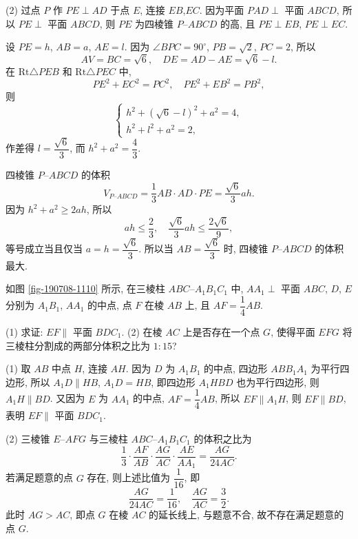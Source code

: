     (2) 过点 $P$ 作 $PE\perp AD$ 于点 $E$, 连接 $EB$,$EC$. 因为平面 $PAD\perp$ 平面 $ABCD$, 所以 $PE\perp$ 平面 $ABCD$, 则 $PE$ 为四棱锥 $P\text{--}ABCD$ 的高, 且 $PE\perp EB$, $PE\perp EC$. 
    
    设 $PE=h$, $AB= a$, $AE= l$. 因为 $\angle BPC=90^\circ$, $PB=\sqrt2$, $PC=2$, 所以
    \[AV= BC= \sqrt6,\quad DE= AD-AE= \sqrt6-l.\]
    在 $\mathrm{Rt}\triangle PEB$ 和 $\mathrm{Rt}\triangle PEC$ 中,
    \[PE^2+ EC^2= PC^2,\quad PE^2+ EB^2= PB^2,\]
    则
    \[\left\{\!\!\begin{array}{l}
        h^2+ (\sqrt6-l)^2+ a^2= 4,\\
        h^2+ l^2+ a^2= 2,
    \end{array}\right.\]
    作差得 $l= \dfrac{\sqrt6}3$, 而 $h^2+a^2= \dfrac43$.

    四棱锥 $P\text{--}ABCD$ 的体积
    \[V_{P\text{--}ABCD}= \frac13 AB\cdot AD\cdot PE
        = \frac{\sqrt6}3 ah.\]
    因为 $h^2+a^2\geqslant 2ah$, 所以 
    \[ah\leqslant \frac23,\quad
        \frac{\sqrt6}3 ah\leqslant \frac{2\sqrt6}9,\]
    等号成立当且仅当 $a=h=\dfrac{\sqrt6}3$. 所以当 $AB= \dfrac{\sqrt6}3$ 时, 四棱锥 $P\text{--}ABCD$ 的体积最大.
\endsolution

\lianxi
\begin{exercise}[s]
    如图 \ref{fig-190708-1110} 所示, 在三棱柱 $ABC\text{--}A_1 B_1 C_1$ 中, $AA_1 \perp$ 平面 $ABC$, $D$, $E$ 分别为 $A_1 B_1$, $AA_1$ 的中点, 点 $F$ 在棱 $AB$ 上, 且 $AF=\dfrac14 AB$.
    
    (1) 求证: $EF\parallel$ 平面 $BDC_1$.\qquad
    (2) 在棱 $AC$ 上是否存在一个点 $G$, 使得平面 $EFG$ 
    将三棱柱分割成的两部分体积之比为 $1:15$?
\end{exercise}
\beginsolution
    (1) 取 $AB$ 中点 $H$, 连接 $AH$. 因为 $D$ 为 $A_1B_1$ 的中点, 四边形 $ABB_1A_1$ 为平行四边形, 所以 $A_1D\parallel HB$, $A_1D= HB$, 即四边形 $A_1HBD$ 也为平行四边形, 则 $A_1H\parallel BD$. 又因为 $E$ 为 $AA_1$ 的中点, $AF= \dfrac14 AB$, 所以 $EF\parallel A_1H$, 则 $EF\parallel BD$, 表明 $EF\parallel$ 平面 $BDC_1$.

    (2) 三棱锥 $E\text{--}AFG$ 与三棱柱 $ABC\text{--}A_1 B_1 C_1$ 的体积之比为
    \[\frac13\cdot \frac{AF}{AB}\cdot \frac{AG}{AC}
        \cdot \frac{AE}{AA_1}= \frac{AG}{24AC}.\]
    若满足题意的点 $G$ 存在, 则上述比值为 $\dfrac1{16}$, 即
    \[\frac{AG}{24AC}= \frac1{16},\quad 
        \frac{AG}{AC}= \frac32.\]
    此时 $AG>AC$, 即点 $G$ 在棱 $AC$ 的延长线上, 与题意不合, 故不存在满足题意的点 $G$.
\endsolution

